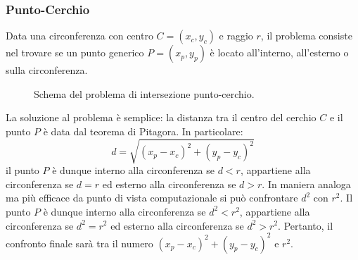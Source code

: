 \subsubsection{Punto-Cerchio}
Data una circonferenza con centro $C = (x_c, y_c)$ e raggio $r$, il problema consiste nel trovare se un punto generico $P = (x_p, y_p)$ è locato all'interno, all'esterno o sulla circonferenza.
\begin{figure}[h]
	\centering
	\caption{Schema del problema di intersezione punto-cerchio.}
\end{figure}
La soluzione al problema è semplice: la distanza tra il centro del cerchio $C$ e il punto $P$ è data dal teorema di Pitagora. In particolare:
\begin{equation}
	d=\sqrt{(x_p-x_c)^2 + (y_p-y_c)^2}
\end{equation}
il punto $P$ è dunque interno alla circonferenza se $d<r$, appartiene alla circonferenza se $d=r$ ed esterno alla circonferenza se $d>r$. In maniera analoga ma più efficace da punto di vista computazionale si può confrontare $d^2$ con $r^2$. Il punto $P$ è dunque interno alla circonferenza se $d^2<r^2$,  appartiene alla circonferenza se $d^2=r^2$ ed esterno alla circonferenza se $d^2>r^2$. Pertanto, il confronto finale sarà tra il numero $(x_p-x_c)^2+(y_p-y_c)^2 $ e $r^2$.

